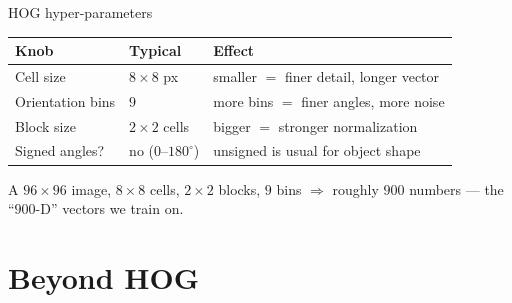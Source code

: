 \documentclass[10pt,aspectratio=169]{beamer}
\begin{document}
\begin{frame}{HOG hyper-parameters}
  \begin{center}
  \begin{tabular}{@{}lll@{}}
    \toprule
    \textbf{Knob} & \textbf{Typical} & \textbf{Effect} \\
    \midrule
    Cell size & $8\times8$ px & smaller $=$ finer detail, longer vector \\
    Orientation bins & $9$ & more bins $=$ finer angles, more noise \\
    Block size & $2\times2$ cells & bigger $=$ stronger normalization \\
    Signed angles? & no ($0$--$180^\circ$) & unsigned is usual for object shape \\
    \bottomrule
  \end{tabular}
  \end{center}
  \begin{infobox}
    A $96\times96$ image, $8\times8$ cells, $2\times2$ blocks, $9$ bins $\Rightarrow$ roughly $900$ numbers — the ``$900$-D'' vectors we train on.
  \end{infobox}
\end{frame}

\section{Beyond HOG}
\end{document}
